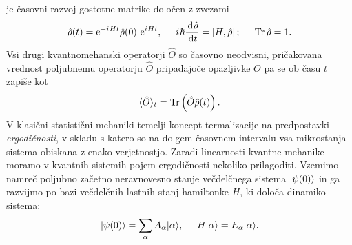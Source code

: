  je časovni razvoj gostotne matrike določen z zvezami 	
\begin{equation}
\hat{\rho}(t)=\mathrm{e}^{-\iu H t}\hat{\rho}(0)\ \mathrm{e}^{\iu H t}, \hspace{5mm} \iu\hbar\frac{\dd \hat{\rho}}{\dd t}=\left[H, \hat{\rho}\right]; \hspace{5mm} \Tr{\hat{\rho}}=1.
\end{equation}
Vsi drugi kvantnomehanski operatorji $\hat{O}$ so časovno neodvisni, pričakovana vrednost poljubnemu operatorju $\hat{O}$ pripadajoče opazljivke $O$ pa se ob času $t$ zapiše kot 
\begin{equation}
\langle \hat{O}\rangle_t = \mathop{\rm Tr}\left(\hat{O}\hat{\rho}(t)\right).
\end{equation}
V klasični statistični mehaniki temelji koncept termalizacije na predpostavki \emph{ergodičnosti}, v skladu s katero so na dolgem časovnem intervalu vsa mikrostanja sistema obiskana z enako verjetnostjo. Zaradi linearnosti kvantne mehanike moramo v kvantnih sistemih pojem ergodičnosti nekoliko prilagoditi. Vzemimo namreč poljubno začetno neravnovesno stanje večdelčnega sistema $\vert\psi(0)\rangle$ in ga razvijmo po bazi večdelčnih lastnih stanj hamiltonke $H$, ki določa dinamiko sistema:
\begin{equation}\label{eq:lastna_stanja}
\vert\psi(0)\rangle=\sum\limits_\alpha A_\alpha \vert\alpha\rangle, \hspace{5mm} H\vert\alpha\rangle=E_\alpha\vert\alpha\rangle.
\end{equation}
